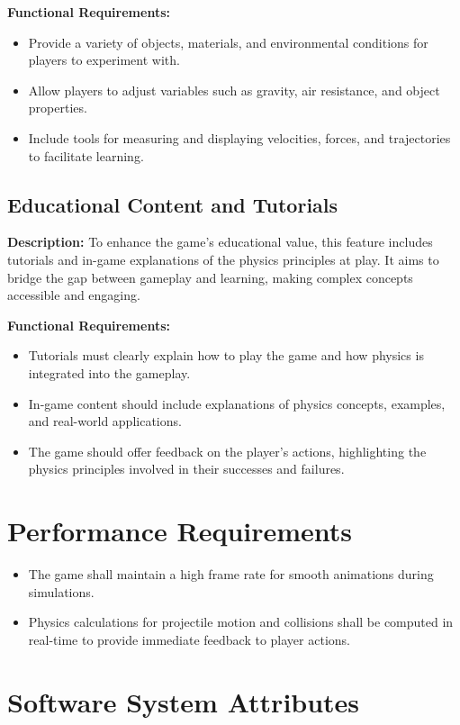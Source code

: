\documentclass[12pt]{article}
\begin{document}
\textbf{Functional Requirements:}
\begin{itemize}
    \item Provide a variety of objects, materials, and environmental conditions for players to experiment with.
    \item Allow players to adjust variables such as gravity, air resistance, and object properties.
    \item Include tools for measuring and displaying velocities, forces, and trajectories to facilitate learning.
\end{itemize}

\subsection{Educational Content and Tutorials}
\textbf{Description:} To enhance the game's educational value, this feature includes tutorials and in-game explanations of the physics principles at play. It aims to bridge the gap between gameplay and learning, making complex concepts accessible and engaging.

\textbf{Functional Requirements:}
\begin{itemize}
    \item Tutorials must clearly explain how to play the game and how physics is integrated into the gameplay.
    \item In-game content should include explanations of physics concepts, examples, and real-world applications.
    \item The game should offer feedback on the player's actions, highlighting the physics principles involved in their successes and failures.
\end{itemize}

\section{Performance Requirements}
\begin{itemize}
    \item The game shall maintain a high frame rate for smooth animations during simulations.
    \item Physics calculations for projectile motion and collisions shall be computed in real-time to provide immediate feedback to player actions.
\end{itemize}

\section{Software System Attributes}
\end{document}
